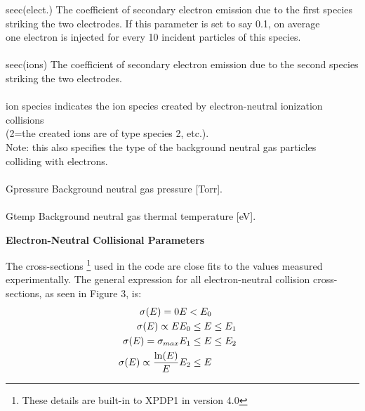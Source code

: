 \begin{section}
\begin{subsection}
\begin{subsubsection}
\begin{tabbing}
      seec(elect.) \>  The coefficient of secondary electron emission due to the
                    first species \> \\
		   \> striking the two electrodes.  If this
                    parameter is set to say 0.1, on average \> \\
		   \> one electron is
                    injected for every 10 incident particles of this species. \> \\
								\\
      seec(ions)   \>  The coefficient of secondary electron emission due to the
                    second species \> \\	
		   \> striking the two electrodes. \> \\
							\\
      ion species  \>  indicates the ion species created by electron-neutral
                    ionization collisions \> \\
		   \> (2=the created ions are of type
                    species 2, etc.). \> \\
                   \>  Note: this also specifies the type of the background
                    neutral gas particles \> \\
		   \> colliding with electrons. \> \\
						\\
      Gpressure    \>  Background neutral gas pressure [Torr]. \> \\
						\\
      Gtemp        \>  Background neutral gas thermal temperature [eV]. \> 
\end{tabbing}
\end{subsubsection}

\begin{subsubsection} {\bf Electron-Neutral Collisional Parameters}

      The cross-sections \footnote {These details are built-in to XPDP1 in 
      version 4.0} used in the code are close fits to the values measured
      experimentally.  The general expression for all electron-neutral collision
      cross-sections, as seen in Figure 3, is:
\begin{eqnarray*}      
\sigma (E) =  0 & E  <  E_{0}&    \\ 	
\sigma (E)  \propto  E &   E_{0} \leq E  \leq E_{1}&  \\ 	
\sigma (E)  =  \sigma_{max} &  E_{1} \leq E   \leq E_{2}& \\ 	
\sigma (E)  \propto   {\ln(E)  \over E}&  E_{2}\leq E&	     
\end{eqnarray*}


\end{subsubsection}
\end{subsection}
\end{section}
